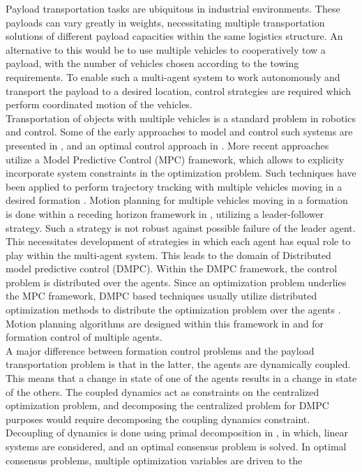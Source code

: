 \documentclass[letterpaper, 10 pt, conference]{ieeeconf}
\begin{document}
Payload transportation tasks are ubiquitous in industrial environments. These payloads can vary greatly in weights, necessitating multiple transportation solutions of different payload capacities within the same logistics structure. An alternative to this would be to use multiple vehicles to cooperatively tow a payload, with the number of vehicles chosen according to the towing requirements. To enable such a multi-agent system to work autonomously and transport the payload to a desired location, control strategies are required which perform coordinated motion of the vehicles.
\\
\indent Transportation of objects with multiple vehicles is a standard problem in robotics and control. Some of the early approaches to model and control such systems are presented in \cite{c1,c2,c3}, and an optimal control approach in \cite{c4}. More recent approaches utilize a Model Predictive Control (MPC) framework, which allows to explicity incorporate system constraints in the optimization problem. Such techniques have been applied to perform trajectory tracking with multiple vehicles moving in a desired formation \cite{c5}. Motion planning for multiple vehicles moving in a formation is done within a receding horizon framework in \cite{c6}, utilizing a leader-follower strategy. Such a strategy is not robust against possible failure of the leader agent. This necessitates development of strategies in which each agent has equal role to play within the multi-agent system. This leads to the domain of Distributed model predictive control (DMPC). Within the DMPC framework, the control problem is distributed over the agents. Since an optimization problem underlies the MPC framework, DMPC based techniques usually utilize distributed optimization methods to distribute the optimization problem over the agents \cite{c7}. Motion planning algorithms are designed within this framework in \cite{c8} and \cite{c9} for formation control of multiple agents.
\\
\indent
 A major difference between formation control problems and the payload transportation problem is that in the latter, the agents are dynamically coupled. This means that a change in state of one of the agents results in a change in state of the others. The coupled dynamics act as constraints on the centralized optimization problem, and decomposing the centralized problem for DMPC purposes would require decomposing the coupling dynamics constraint. Decoupling of dynamics is done using primal decomposition
 in \cite{c10}, in which, linear systems are considered, and an optimal consensus problem is solved. In optimal consensus problems, multiple optimization variables are driven to the
\end{document}
